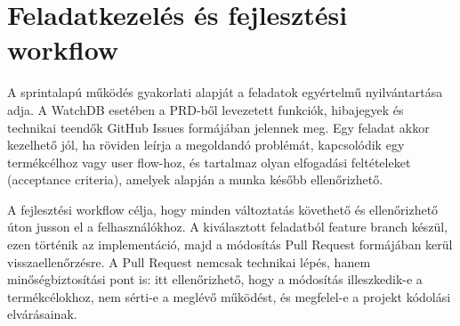 \section{Feladatkezelés és fejlesztési workflow}

A sprintalapú működés gyakorlati alapját a feladatok egyértelmű nyilvántartása adja. A WatchDB esetében a PRD-ből levezetett funkciók, hibajegyek és technikai teendők GitHub Issues formájában jelennek meg. Egy feladat akkor kezelhető jól, ha röviden leírja a megoldandó problémát, kapcsolódik egy termékcélhoz vagy user flow-hoz, és tartalmaz olyan elfogadási feltételeket (acceptance criteria), amelyek alapján a munka később ellenőrizhető.

A fejlesztési workflow célja, hogy minden változtatás követhető és ellenőrizhető úton jusson el a felhasználókhoz. A kiválasztott feladatból feature branch készül, ezen történik az implementáció, majd a módosítás Pull Request formájában kerül visszaellenőrzésre. A Pull Request nemcsak technikai lépés, hanem minőségbiztosítási pont is: itt ellenőrizhető, hogy a módosítás illeszkedik-e a termékcélokhoz, nem sérti-e a meglévő működést, és megfelel-e a projekt kódolási elvárásainak.

